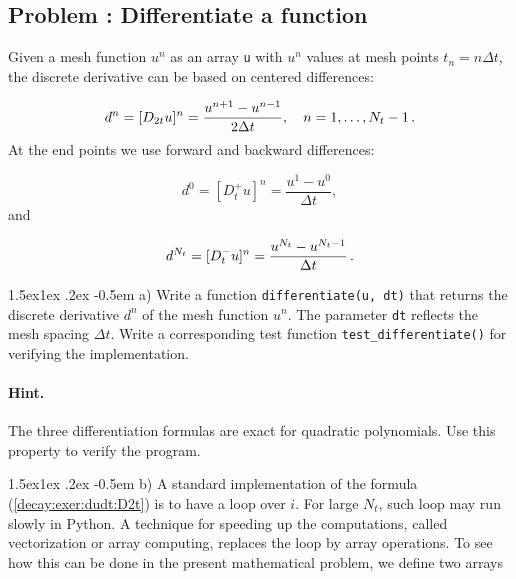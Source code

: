\documentclass[%
oneside,                 %
final,                   %
10pt]{article}
\makeatletter
\newenvironment{doconceexercise}{}{}
\newcounter{doconceexercisecounter}
\newcommand\subex{\@startsection{paragraph}{4}{\z@}%
                  {1.5ex\@plus1ex \@minus.2ex}%
                  {-0.5em}%
                  {\normalfont\normalsize\bfseries}}
\makeatother
\begin{document}
\begin{doconceexercise}

\subsection*{Problem \thedoconceexercisecounter: Differentiate a function}

\label{decay:exer:dudt}

  

Given a mesh function $u^n$ as an array \texttt{u} with $u^n$ values at mesh
points $t_n=n\Delta t$, the discrete derivative can be based on
centered differences:

\begin{equation}
d^n = [D_{2t}u]^n =
\frac{u^{n+1}-u^{n-1}}{2\Delta t},\quad n=1,\ldots,N_t-1\thinspace .
\label{decay:exer:dudt:D2t}
\end{equation}
At the end points we use forward and backward differences:

\[ d^0 = [D_t^+u]^n = \frac{u^{1}-u^{0}}{\Delta t},\]
and

\[ d^{N_t} = [D_t^-u]^n = \frac{u^{N_t}-u^{N_t-1}}{\Delta t}\thinspace .\]


\subex{a)}
Write a function
\texttt{differentiate(u, dt)} that returns the discrete derivative $d^n$ of the
mesh function $u^n$. The parameter \texttt{dt} reflects the
mesh spacing $\Delta t$. Write a corresponding test function
\Verb!test_differentiate()! for verifying the implementation.


\paragraph{Hint.}
The three differentiation formulas are
exact for quadratic polynomials. Use this property to verify the program.




\subex{b)}
A standard implementation of the formula (\ref{decay:exer:dudt:D2t}) is to
have a loop over $i$. For large $N_t$, such loop may run slowly in
Python. A technique for speeding up the computations, called vectorization
or array computing,
replaces the loop by array operations. To see how this can be done in
the present mathematical problem, we
define two arrays


\end{doconceexercise}
\end{document}
